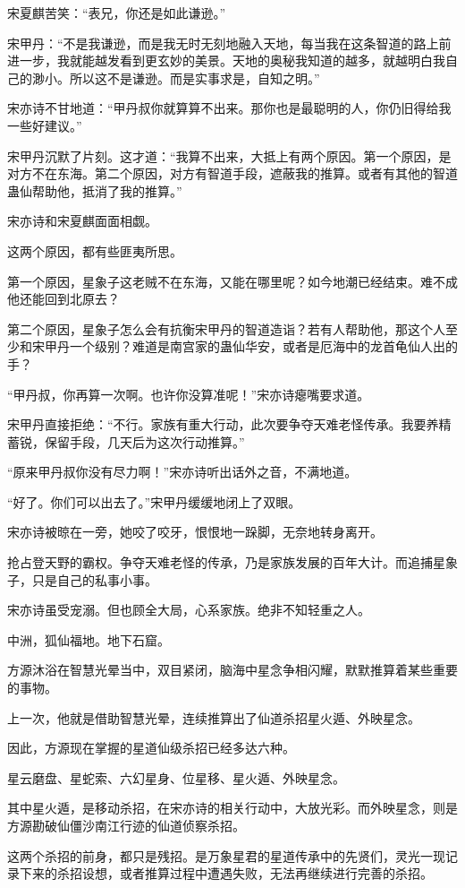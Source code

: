 \begin{this_body}
宋夏麒苦笑：“表兄，你还是如此谦逊。”

宋甲丹：“不是我谦逊，而是我无时无刻地融入天地，每当我在这条智道的路上前进一步，我就能越发看到更玄妙的美景。天地的奥秘我知道的越多，就越明白我自己的渺小。所以这不是谦逊。而是实事求是，自知之明。”

宋亦诗不甘地道：“甲丹叔你就算算不出来。那你也是最聪明的人，你仍旧得给我一些好建议。”

宋甲丹沉默了片刻。这才道：“我算不出来，大抵上有两个原因。第一个原因，是对方不在东海。第二个原因，对方有智道手段，遮蔽我的推算。或者有其他的智道蛊仙帮助他，抵消了我的推算。”

宋亦诗和宋夏麒面面相觑。

这两个原因，都有些匪夷所思。

第一个原因，星象子这老贼不在东海，又能在哪里呢？如今地潮已经结束。难不成他还能回到北原去？

第二个原因，星象子怎么会有抗衡宋甲丹的智道造诣？若有人帮助他，那这个人至少和宋甲丹一个级别？难道是南宫家的蛊仙华安，或者是厄海中的龙首龟仙人出的手？

“甲丹叔，你再算一次啊。也许你没算准呢！”宋亦诗瘪嘴要求道。

宋甲丹直接拒绝：“不行。家族有重大行动，此次要争夺天难老怪传承。我要养精蓄锐，保留手段，几天后为这次行动推算。”

“原来甲丹叔你没有尽力啊！”宋亦诗听出话外之音，不满地道。

“好了。你们可以出去了。”宋甲丹缓缓地闭上了双眼。

宋亦诗被晾在一旁，她咬了咬牙，恨恨地一跺脚，无奈地转身离开。

抢占登天野的霸权。争夺天难老怪的传承，乃是家族发展的百年大计。而追捕星象子，只是自己的私事小事。

宋亦诗虽受宠溺。但也顾全大局，心系家族。绝非不知轻重之人。

中洲，狐仙福地。地下石窟。

方源沐浴在智慧光晕当中，双目紧闭，脑海中星念争相闪耀，默默推算着某些重要的事物。

上一次，他就是借助智慧光晕，连续推算出了仙道杀招星火遁、外映星念。

因此，方源现在掌握的星道仙级杀招已经多达六种。

星云磨盘、星蛇索、六幻星身、位星移、星火遁、外映星念。

其中星火遁，是移动杀招，在宋亦诗的相关行动中，大放光彩。而外映星念，则是方源勘破仙僵沙南江行迹的仙道侦察杀招。

这两个杀招的前身，都只是残招。是万象星君的星道传承中的先贤们，灵光一现记录下来的杀招设想，或者推算过程中遭遇失败，无法再继续进行完善的杀招。


\end{this_body}
